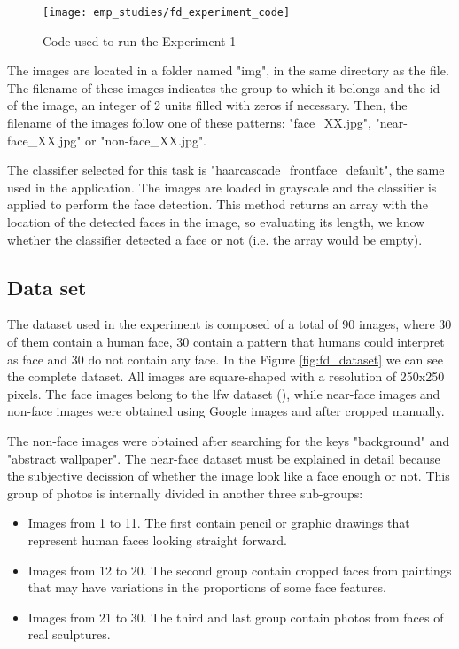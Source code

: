 	\begin{figure}[!ht]
		\centering
		\texttt{[image: emp\_studies/fd\_experiment\_code]}
		\caption{Code used to run the Experiment 1}
		\label{fig:fd_experiment_code}
	\end{figure}

	The images are located in a folder named "img", in the same directory as the file. The filename of these images indicates the group to which it belongs and the id of the image, an integer of 2 units filled with zeros if necessary. Then, the filename of the images follow one of these patterns: "face{\_}XX.jpg", "near-face{\_}XX.jpg" or "non-face{\_}XX.jpg".

	The classifier selected for this task is "haarcascade{\_}frontface{\_}default", the same used in the application. The images are loaded in grayscale and the classifier is applied to perform the face detection. This method returns an array with the location of the detected faces in the image, so evaluating its length, we know whether the classifier detected a face or not (i.e. the array would be empty). 

	\subsection{Data set}
	The dataset used in the experiment is composed of a total of 90 images, where 30 of them contain a human face, 30 contain a pattern that humans could interpret as face and 30 do not contain any face. In the Figure \ref{fig:fd_dataset} we can see the complete dataset. All images are square-shaped with a resolution of 250x250 pixels. The face images belong to the \gls{lfw} dataset (\cite{lfw_db}), while near-face images and non-face images were obtained using Google images and after cropped manually.

	The non-face images were obtained after searching for the keys "background" and "abstract wallpaper". The near-face dataset must be explained in detail because the subjective decission of whether the image look like a face enough or not. This group of photos is internally divided in another three sub-groups:

	\begin{itemize}
		\item Images from 1 to 11. The first contain pencil or graphic drawings that represent human faces looking straight forward.
		\item Images from 12 to 20. The second group contain cropped faces from paintings that may have variations in the proportions of some face features. 
		\item Images from 21 to 30. The third and last group contain photos from faces of real sculptures.
	\end{itemize}

